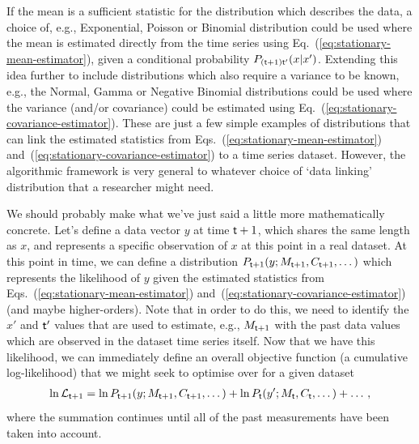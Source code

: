 If the mean is a sufficient statistic for the distribution which describes the data, a choice of, e.g., Exponential, Poisson or Binomial distribution could be used where the mean is estimated directly from the time series using Eq.~(\ref{eq:stationary-mean-estimator}), given a conditional probability $P_{({\sf t}+1){\sf t}'}(x\vert x')$. Extending this idea further to include distributions which also require a variance to be known, e.g., the Normal, Gamma or Negative Binomial distributions could be used where the variance (and/or covariance) could be estimated using Eq.~(\ref{eq:stationary-covariance-estimator}). These are just a few simple examples of distributions that can link the estimated statistics from Eqs.~(\ref{eq:stationary-mean-estimator}) and~(\ref{eq:stationary-covariance-estimator}) to a time series dataset. However, the algorithmic framework is very general to whatever choice of `data linking' distribution that a researcher might need.

We should probably make what we've just said a little more mathematically concrete. Let's define a data vector $y$ at time ${\sf t}+1$, which shares the same length as $x$, and represents a specific observation of $x$ at this point in a real dataset. At this point in time, we can define a distribution $P_{{\sf t}+1}(y;M_{{\sf t}+1},C_{{\sf t}+1},\dots )$ which represents the likelihood of $y$ given the estimated statistics from Eqs.~(\ref{eq:stationary-mean-estimator}) and~(\ref{eq:stationary-covariance-estimator}) (and maybe higher-orders). Note that in order to do this, we need to identify the $x'$ and ${\sf t}'$ values that are used to estimate, e.g., $M_{{\sf t}+1}$ with the past data values which are observed in the dataset time series itself. Now that we have this likelihood, we can immediately define an overall objective function (a cumulative log-likelihood) that we might seek to optimise over for a given dataset 
\begin{align}
\ln {\cal L}_{{\sf t}+1} = \ln P_{{\sf t}+1}(y;M_{{\sf t}+1},C_{{\sf t}+1},\dots ) + \ln P_{{\sf t}}(y';M_{{\sf t}},C_{{\sf t}},\dots ) + \dots \,, \label{eq:log-likelihood-filter}
\end{align}
where the summation continues until all of the past measurements have been taken into account.


